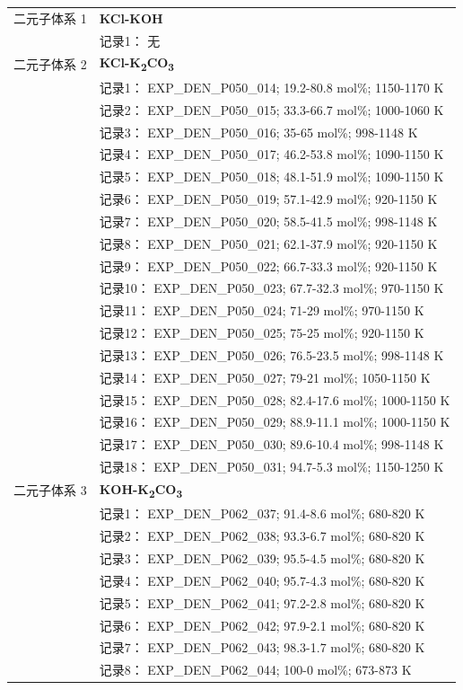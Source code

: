 \documentclass[12pt]{article}
\begin{document}
{\begin{longtable}[]{@{}
  >{\raggedright\arraybackslash}p{}
  >{\raggedright\arraybackslash}p{}@{}}
二元子体系 1 & \textbf{KCl-KOH} \\
 & 记录1： 无 \\
二元子体系 2  & \textbf{KCl-K\textsubscript{2}CO\textsubscript{3}} \\
 & 记录1： EXP\_DEN\_P050\_014; 19.2-80.8 mol\%; 1150-1170 K \\
 & 记录2： EXP\_DEN\_P050\_015; 33.3-66.7 mol\%; 1000-1060 K \\
 & 记录3： EXP\_DEN\_P050\_016; 35-65 mol\%; 998-1148 K \\
 & 记录4： EXP\_DEN\_P050\_017; 46.2-53.8 mol\%; 1090-1150 K \\
 & 记录5： EXP\_DEN\_P050\_018; 48.1-51.9 mol\%; 1090-1150 K \\
 & 记录6： EXP\_DEN\_P050\_019; 57.1-42.9 mol\%; 920-1150 K \\
 & 记录7： EXP\_DEN\_P050\_020; 58.5-41.5 mol\%; 998-1148 K \\
 & 记录8： EXP\_DEN\_P050\_021; 62.1-37.9 mol\%; 920-1150 K \\
 & 记录9： EXP\_DEN\_P050\_022; 66.7-33.3 mol\%; 920-1150 K \\
 & 记录10： EXP\_DEN\_P050\_023; 67.7-32.3 mol\%; 970-1150 K \\
 & 记录11： EXP\_DEN\_P050\_024; 71-29 mol\%; 970-1150 K \\
 & 记录12： EXP\_DEN\_P050\_025; 75-25 mol\%; 920-1150 K \\
 & 记录13： EXP\_DEN\_P050\_026; 76.5-23.5 mol\%; 998-1148 K \\
 & 记录14： EXP\_DEN\_P050\_027; 79-21 mol\%; 1050-1150 K \\
 & 记录15： EXP\_DEN\_P050\_028; 82.4-17.6 mol\%; 1000-1150 K \\
 & 记录16： EXP\_DEN\_P050\_029; 88.9-11.1 mol\%; 1000-1150 K \\
 & 记录17： EXP\_DEN\_P050\_030; 89.6-10.4 mol\%; 998-1148 K \\
 & 记录18： EXP\_DEN\_P050\_031; 94.7-5.3 mol\%; 1150-1250 K  \\

二元子体系 3  & \textbf{KOH-K\textsubscript{2}CO\textsubscript{3}} \\
 & 记录1： EXP\_DEN\_P062\_037; 91.4-8.6 mol\%; 680-820 K \\
 & 记录2： EXP\_DEN\_P062\_038; 93.3-6.7 mol\%; 680-820 K \\
 & 记录3： EXP\_DEN\_P062\_039; 95.5-4.5 mol\%; 680-820 K \\
 & 记录4： EXP\_DEN\_P062\_040; 95.7-4.3 mol\%; 680-820 K \\
 & 记录5： EXP\_DEN\_P062\_041; 97.2-2.8 mol\%; 680-820 K \\
 & 记录6： EXP\_DEN\_P062\_042; 97.9-2.1 mol\%; 680-820 K \\
 & 记录7： EXP\_DEN\_P062\_043; 98.3-1.7 mol\%; 680-820 K \\
 & 记录8： EXP\_DEN\_P062\_044; 100-0 mol\%; 673-873 K  \\


\end{longtable}}
\end{document}
